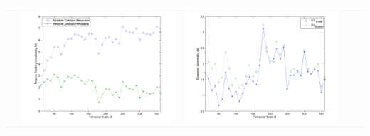 \documentclass[11pt]{article}
\begin{document}
\begin{table}[H]
{\begin{tabular}{c  c   c   c  c }
&\begin{minipage}{.4\textwidth}\includegraphics[width=\linewidth]{resultgraph/02165000AU.png}\end{minipage}
&\begin{minipage}{.4\textwidth}\includegraphics[width=\linewidth]{resultgraph/02165000EU.png}\end{minipage}
\\

\end{tabular}}
\end{table}
\end{document}
